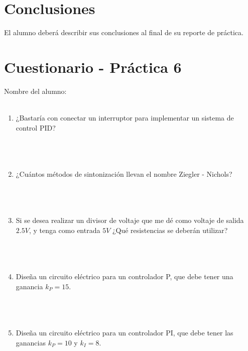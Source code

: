 \section{Conclusiones}

	El alumno deberá describir sus conclusiones al final de su reporte de práctica.


\clearpage
\section{Cuestionario - Práctica 6}
	Nombre del alumno: \\[0.2cm]
	\horrule{0.5pt} \\[0.2cm] %

	\begin{enumerate}
		\item ¿Bastaría con conectar un interruptor para implementar un sistema de control PID? \\ \\ \\ \\
		\item ¿Cuántos métodos de sintonización llevan el nombre Ziegler - Nichols? \\ \\ \\ \\
		\item Si se desea realizar un divisor de voltaje que me dé como voltaje de salida $2.5 V$, y tenga como entrada $5 V$ ¿Qué resistencias se deberán utilizar? \\ \\ \\ \\
		\item Diseña un circuito eléctrico para un controlador P, que debe tener una ganancia $k_P = 15$. \\ \\ \\ \\
		\item Diseña un circuito eléctrico para un controlador PI, que debe tener las ganancias $k_P = 10$ y $k_I = 8$. \\
	\end{enumerate}

